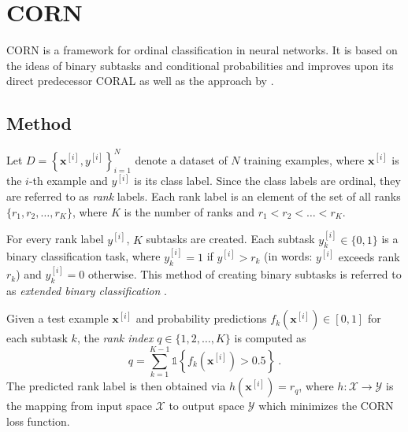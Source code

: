 \section{CORN} \label{sec:ordinal:corn}
\acf{CORN} \cite{corn}
is a framework for ordinal classification in neural networks.
It is based on the ideas of binary subtasks and conditional probabilities
and improves upon
  its direct predecessor \ac{CORAL} \cite{coral}
  as well as the approach by \citeauthor{extended_binary_nn} \cite{extended_binary_nn}.
%
%
%


\subsection{Method} \label{sec:corn:method}
%
Let $D = \left\{ \mathbf{x}^{[i]}, y^{[i]} \right\}_{i=1}^N$ denote a dataset of $N$ training examples,
where $\mathbf{x}^{[i]}$ is the $i$-th example and $y^{[i]}$ is its class label.
Since the class labels are ordinal, they are referred to as \emph{rank} labels.
Each rank label is an element of the set of all ranks $\{r_1, r_2, \ldots, r_K\}$,
  where
  $K$ is the number of ranks
  and $r_1 < r_2 < \ldots < r_K$.

For every rank label $y^{[i]}$,
$K$ subtasks are created. %
Each subtask $y^{[i]}_k \in \{0, 1\}$ is a binary classification task,
  where
    $y^{[i]}_k = 1$ if $y^{[i]} > r_k$ (in words: {$y^{[i]}$ exceeds rank $r_k$})
    and $y^{[i]}_k = 0$ otherwise.
This method of creating binary subtasks is referred to as \emph{extended binary classification} \cite{extended_binary}.

Given a test example $\mathbf{x}^{[i]}$
and probability predictions $f_k(\mathbf{x}^{[i]}) \in [0,1]$ for each subtask $k$,
the \emph{rank index} $q \in \{1, 2, \ldots, K\}$ is computed as
\begin{equation}
  q = \sum_{k=1}^{K-1} \mathbb{1}\left\{f_k(\mathbf{x}^{[i]}) > 0.5\right\} \ .
\end{equation}
The predicted rank label is then obtained via
$h(\mathbf{x}^{[i]}) = r_q$,
where $h: \mathcal{X} \to \mathcal{Y}$ is the mapping from input space $\mathcal{X}$ to output space $\mathcal{Y}$ %
which minimizes the CORN loss function.


